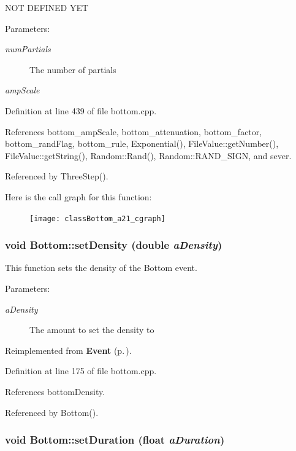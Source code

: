 NOT DEFINED YET \begin{Desc}
\item[Parameters:]
\begin{description}
\item[{\em num\-Partials}]The number of partials \item[{\em amp\-Scale}]\end{description}
\end{Desc}


Definition at line 439 of file bottom.cpp.

References bottom\_\-amp\-Scale, bottom\_\-attenuation, bottom\_\-factor, bottom\_\-rand\-Flag, bottom\_\-rule, Exponential(), File\-Value::get\-Number(), File\-Value::get\-String(), Random::Rand(), Random::RAND\_\-SIGN, and sever.

Referenced by Three\-Step().

Here is the call graph for this function:\begin{figure}[H]
\begin{center}
\leavevmode
\texttt{[image: classBottom\_a21\_cgraph]}
\end{center}
\end{figure}
\subsubsection{\setlength{\rightskip}{0pt plus 5cm}void Bottom::set\-Density (double {\em a\-Density})\hspace{0.3cm}{\tt  [virtual]}}\label{classBottom_a9}


This function sets the density of the Bottom event. \begin{Desc}
\item[Parameters:]
\begin{description}
\item[{\em a\-Density}]The amount to set the density to \end{description}
\end{Desc}


Reimplemented from {\bf Event} {\rm (p.\,\pageref{classEvent_a11})}.

Definition at line 175 of file bottom.cpp.

References bottom\-Density.

Referenced by Bottom().
\subsubsection{\setlength{\rightskip}{0pt plus 5cm}void Bottom::set\-Duration (float {\em a\-Duration})\hspace{0.3cm}{\tt  [virtual]}}\label{classBottom_a8}


